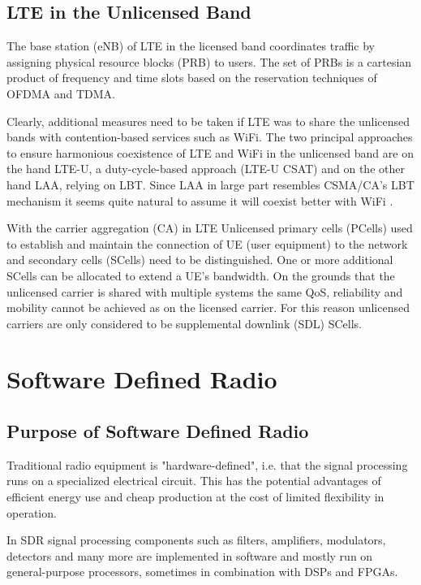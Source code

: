 \subsection{LTE in the Unlicensed Band}
\label{sec:lte-mac}

The base station (eNB) of LTE in the licensed band coordinates traffic by assigning physical resource blocks (PRB) to users. The set of PRBs is a cartesian product of frequency and time slots based on the reservation techniques of OFDMA and TDMA. 

Clearly, additional measures need to be taken if LTE was to share the unlicensed bands with contention-based services such as WiFi. The two principal approaches to ensure harmonious coexistence of LTE and WiFi in the unlicensed band are on the hand LTE-U, a duty-cycle-based approach (LTE-U CSAT) and on the other hand LAA, relying on LBT. Since LAA in large part resembles CSMA/CA's LBT mechanism it seems quite natural to assume it will coexist better with WiFi \cite{kwon17}.

With the carrier aggregation (CA) in LTE Unlicensed primary cells (PCells) used to establish and maintain the connection of UE (user equipment) to the network and secondary cells (SCells) need to be distinguished. One or more additional SCells can be allocated to extend a UE's bandwidth. On the grounds that the unlicensed carrier is shared with multiple systems the same QoS, reliability and mobility cannot be achieved as on the licensed carrier. For this reason unlicensed carriers are only considered to be supplemental downlink (SDL) SCells.

\section{Software Defined Radio}
 
\subsection{Purpose of Software Defined Radio}

Traditional radio equipment is "hardware-defined", i.e. that the signal processing runs on a specialized electrical circuit. This has the potential advantages of efficient energy use and cheap production at the cost of limited flexibility in operation. 

In SDR signal processing components such as filters, amplifiers, modulators, detectors and many more are implemented in software and mostly run on general-purpose processors, sometimes in combination with DSPs and FPGAs.

